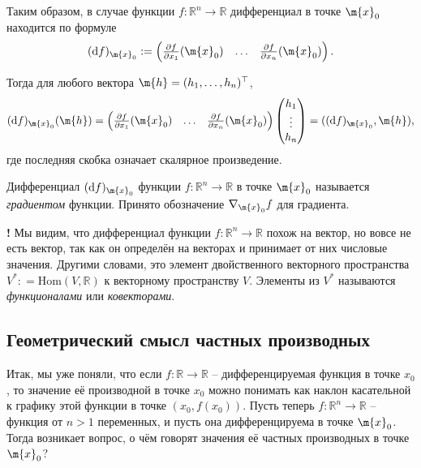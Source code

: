 Таким образом, в случае функции $f:\mathbb{R}^n \to \mathbb{R}$ дифференциал в точке $\m{x}_0$ находится по формуле
\[
 (\mathrm{d}f)_{\m{x}_0}: = \begin{pmatrix}
     \frac{\partial f}{\partial x_1}(\m{x}_0) & \ldots & \frac{\partial f}{\partial x_n}(\m{x}_0)
 \end{pmatrix}.
\]

Тогда для любого вектора $\m{h} = (h_1,\ldots, h_n)^\top$,
\[
 (\mathrm{d}f)_{\m{x}_0}(\m{h}) =  \begin{pmatrix}
     \frac{\partial f}{\partial x_1}(\m{x}_0) & \ldots & \frac{\partial f}{\partial x_n}(\m{x}_0)
 \end{pmatrix} \begin{pmatrix}
     h_1 \\ \vdots \\ h_n
 \end{pmatrix} = ((\mathrm{d}f)_{\m{x}_0}, \m{h}),
\]
где последняя скобка означает скалярное произведение.

\begin{definition}
    Дифференциал $(\mathrm{d}f)_{\m{x}_0}$ функции $f: \mathbb{R}^n \to \mathbb{R}$ в точке $\m{x}_0$ называется \textit{градиентом} функции. Принято обозначение $\nabla_{\m{x}_0}f$ для градиента.
\end{definition}

\begin{mydanger}{\bf{!}}
 Мы видим, что дифференциал функции $f:\mathbb{R}^n \to \mathbb{R}$ похож на вектор, но вовсе не есть вектор, так как он определён на векторах и принимает от них числовые значения. Другими словами, это элемент двойственного векторного пространства $V^*: = \mathrm{Hom}(V, \mathbb{R})$ к векторному пространству $V$. Элементы из $V^*$ называются \textit{функционалами} или \textit{ковекторами}.    
\end{mydanger}


\subsection{Геометрический смысл частных производных}

Итак, мы уже поняли, что если $f:\mathbb{R} \to \mathbb{R}$ -- дифференцируемая функция в точке $x_0$, то значение её производной в точке $x_0$ можно понимать как наклон касательной к графику этой функции в точке $(x_0, f(x_0))$. Пусть теперь $f:\mathbb{R}^n \to \mathbb{R}$ -- функция от $n>1$ переменных, и пусть она дифференцируема в точке $\m{x}_0$. Тогда возникает вопрос, о чём говорят значения её частных производных в точке $\m{x}_0$?

